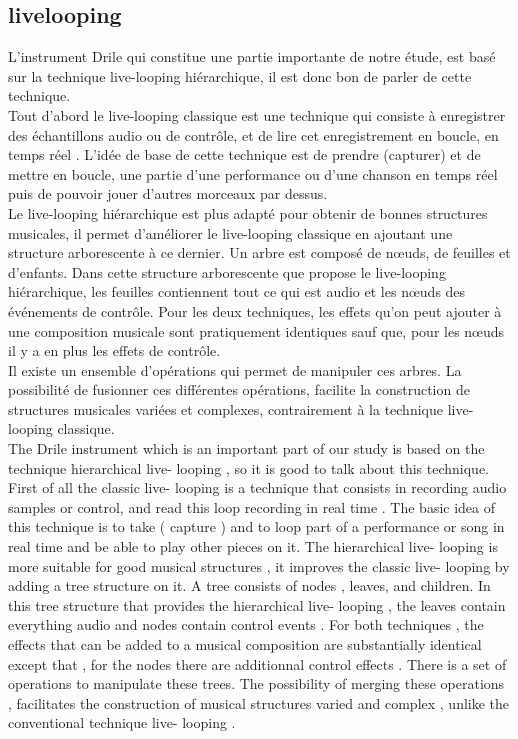 \subsection{livelooping}
L'instrument Drile qui constitue une partie importante de notre étude, est basé sur la technique live-looping hiérarchique, il est donc bon de parler de cette technique.\\
Tout d'abord le live-looping classique est une technique qui consiste à enregistrer des échantillons audio ou de contrôle, et de lire cet enregistrement en boucle, en temps réel . L'idée de base de cette technique est de prendre (capturer) et de mettre en boucle, une partie d'une performance ou d'une chanson en temps réel puis de pouvoir jouer d'autres morceaux par dessus. \\
Le live-looping hiérarchique est plus adapté pour obtenir de bonnes structures musicales, il permet d'améliorer le live-looping classique en ajoutant une structure arborescente à ce dernier. Un arbre est composé de nœuds, de feuilles et d’enfants. Dans cette structure arborescente que propose le live-looping hiérarchique, les feuilles contiennent tout ce qui est audio et les nœuds des événements de contrôle. Pour les deux techniques, les effets qu'on peut ajouter à une composition musicale sont pratiquement identiques sauf que, pour les nœuds il y a en plus les effets de contrôle.\\
Il existe un ensemble d'opérations qui permet de manipuler ces arbres. La possibilité de fusionner ces différentes opérations, facilite la construction de structures musicales variées et complexes, contrairement à la technique live-looping classique.\\

The Drile instrument which is an important part of our study is based on the technique hierarchical live- looping , so it is good to talk about this technique. First of all the classic live- looping is a technique that consists in recording audio samples or control, and read this loop recording in real time . The basic idea of this technique is to take ( capture ) and to loop part of a performance or song in real time and be able to play other pieces on it. The hierarchical live- looping is more suitable for good musical structures , it improves the classic live- looping by adding a tree structure on it. A tree consists of nodes , leaves, and children. In this tree structure that provides the hierarchical live- looping , the leaves contain everything audio and nodes contain control events . For both techniques , the effects that can be added to a musical composition are substantially identical except that , for the nodes there are additionnal control effects . There is a set of operations to manipulate these trees. The possibility of merging these operations , facilitates the construction of musical structures varied and complex , unlike the conventional technique live- looping .
